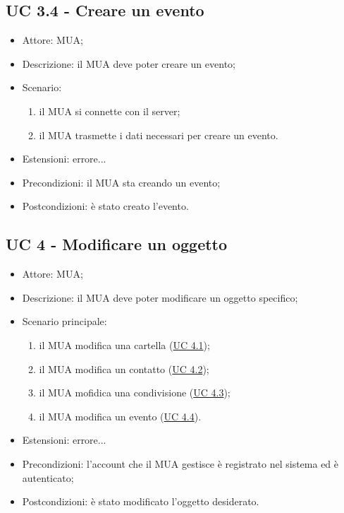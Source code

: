     \subsection{UC 3.4 - Creare un evento} \label{sec: UC 3.4}
    \begin{itemize}
        \item Attore: MUA;
        \item Descrizione: il MUA deve poter creare un evento;
        \item Scenario:
        \begin{enumerate}
        \item il MUA si connette con il server;
        \item il MUA trasmette i dati necessari per creare un evento.
        \end{enumerate}
        \item Estensioni: errore...
        \item Precondizioni: il MUA sta creando un evento;
        \item Postcondizioni: è stato creato l'evento.
    \end{itemize}

    \subsection{UC 4 - Modificare un oggetto} \label{sec: UC 4}
    \begin{itemize}
        \item Attore: MUA;
        \item Descrizione: il MUA deve poter modificare un oggetto specifico;
        \item Scenario principale:
            \begin{enumerate}
            \item il MUA modifica una cartella (\hyperref[sec: UC 4.1]{UC 4.1});
            \item il MUA modifica un contatto (\hyperref[sec: UC 4.2]{UC 4.2});
            \item il MUA mofidica una condivisione (\hyperref[sec: UC 4.3]{UC 4.3});
            \item il MUA modifica un evento (\hyperref[sec: UC 4.4]{UC 4.4}).
            \end{enumerate}
        \item Estensioni: errore...
        \item Precondizioni: l’account che il MUA gestisce è registrato nel sistema ed è autenticato;
        \item Postcondizioni: è stato modificato l’oggetto desiderato.
    \end{itemize}


